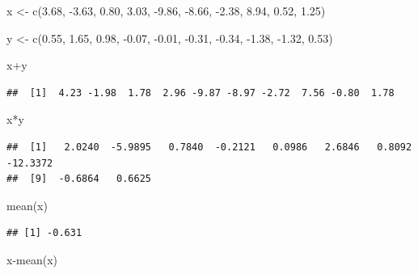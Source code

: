 \documentclass[
]{book}
\newenvironment{Shaded}{\begin{snugshade}}{\end{snugshade}}
\newcommand{\FloatTok}[1]{\textcolor[rgb]{0.00,0.00,0.81}{#1}}
\newcommand{\FunctionTok}[1]{\textcolor[rgb]{0.00,0.00,0.00}{#1}}
\newcommand{\NormalTok}[1]{#1}
\newcommand{\OtherTok}[1]{\textcolor[rgb]{0.56,0.35,0.01}{#1}}
\newcommand{\SpecialCharTok}[1]{\textcolor[rgb]{0.00,0.00,0.00}{#1}}
\theoremstyle{definition}
\theoremstyle{definition}
\theoremstyle{definition}
\theoremstyle{definition}
\theoremstyle{remark}
\begin{document}
\begin{Shaded}
\begin{Highlighting}[]
\NormalTok{x }\OtherTok{\textless{}{-}} \FunctionTok{c}\NormalTok{(}\FloatTok{3.68}\NormalTok{, }\SpecialCharTok{{-}}\FloatTok{3.63}\NormalTok{, }\FloatTok{0.80}\NormalTok{, }\FloatTok{3.03}\NormalTok{, }\SpecialCharTok{{-}}\FloatTok{9.86}\NormalTok{, }\SpecialCharTok{{-}}\FloatTok{8.66}\NormalTok{, }
    \SpecialCharTok{{-}}\FloatTok{2.38}\NormalTok{, }\FloatTok{8.94}\NormalTok{, }\FloatTok{0.52}\NormalTok{, }\FloatTok{1.25}\NormalTok{) }

\NormalTok{y }\OtherTok{\textless{}{-}} \FunctionTok{c}\NormalTok{(}\FloatTok{0.55}\NormalTok{, }\FloatTok{1.65}\NormalTok{, }\FloatTok{0.98}\NormalTok{, }\SpecialCharTok{{-}}\FloatTok{0.07}\NormalTok{, }\SpecialCharTok{{-}}\FloatTok{0.01}\NormalTok{, }\SpecialCharTok{{-}}\FloatTok{0.31}\NormalTok{, }
    \SpecialCharTok{{-}}\FloatTok{0.34}\NormalTok{, }\SpecialCharTok{{-}}\FloatTok{1.38}\NormalTok{, }\SpecialCharTok{{-}}\FloatTok{1.32}\NormalTok{, }\FloatTok{0.53}\NormalTok{)}

\NormalTok{x}\SpecialCharTok{+}\NormalTok{y}
\end{Highlighting}
\end{Shaded}

\begin{verbatim}
##  [1]  4.23 -1.98  1.78  2.96 -9.87 -8.97 -2.72  7.56 -0.80  1.78
\end{verbatim}

\begin{Shaded}
\begin{Highlighting}[]
\NormalTok{x}\SpecialCharTok{*}\NormalTok{y}
\end{Highlighting}
\end{Shaded}

\begin{verbatim}
##  [1]   2.0240  -5.9895   0.7840  -0.2121   0.0986   2.6846   0.8092 -12.3372
##  [9]  -0.6864   0.6625
\end{verbatim}

\begin{Shaded}
\begin{Highlighting}[]
\FunctionTok{mean}\NormalTok{(x)}
\end{Highlighting}
\end{Shaded}

\begin{verbatim}
## [1] -0.631
\end{verbatim}

\begin{Shaded}
\begin{Highlighting}[]
\NormalTok{x}\SpecialCharTok{{-}}\FunctionTok{mean}\NormalTok{(x)}
\end{Highlighting}
\end{Shaded}
\end{document}
